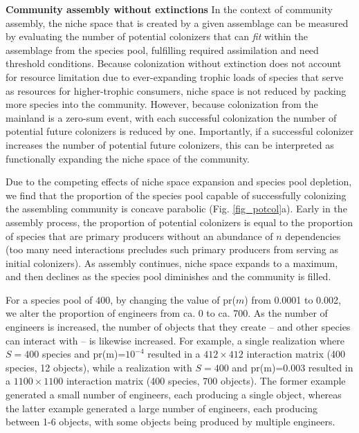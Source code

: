\documentclass[twocolumn,preprintnumbers,amsmath,amssymb,superscriptaddress]{revtex4}
\begin{document}
{\bf Community assembly without extinctions}
In the context of community assembly, the niche space that is created by a given assemblage can be measured by evaluating the number of potential colonizers that can \emph{fit} within the assemblage from the species pool, fulfilling required assimilation and need threshold conditions.
Because colonization without extinction does not account for resource limitation due to ever-expanding trophic loads of species that serve as resources for higher-trophic consumers, niche space is not reduced by packing more species into the community.
However, because colonization from the mainland is a zero-sum event, with each successful colonization the number of potential future colonizers is reduced by one.
Importantly, if a successful colonizer increases the number of potential future colonizers, this can be interpreted as functionally expanding the niche space of the community.




Due to the competing effects of niche space expansion and species pool depletion, we find that the proportion of the species pool capable of successfully colonizing the assembling community is concave parabolic (Fig. \ref{fig_potcol}a).
Early in the assembly process, the proportion of potential colonizers is equal to the proportion of species that are primary producers without an abundance of $n$ dependencies (too many need interactions precludes such primary producers from serving as initial colonizers).
As assembly continues, niche space expands to a maximum, and then declines as the species pool diminishes and the community is filled.


For a species pool of $400$, by changing the value of pr($m$) from 0.0001 to 0.002, we alter the proportion of engineers from ca. 0 to ca. 700.
As the number of engineers is increased, the number of objects that they create -- and other species can interact with -- is likewise increased.
For example, a single realization where $S=400$ species and pr(m)=$10^{-4}$ resulted in a $412\times412$ interaction matrix (400 species, 12 objects), while a realization with $S=400$ and pr(m)=$0.003$ resulted in a $1100\times1100$ interaction matrix (400 species, 700 objects).
The former example generated a small number of engineers, each producing a single object, whereas the latter example generated a large number of engineers, each producing between 1-6 objects, with some objects being produced by multiple engineers.
\end{document}
